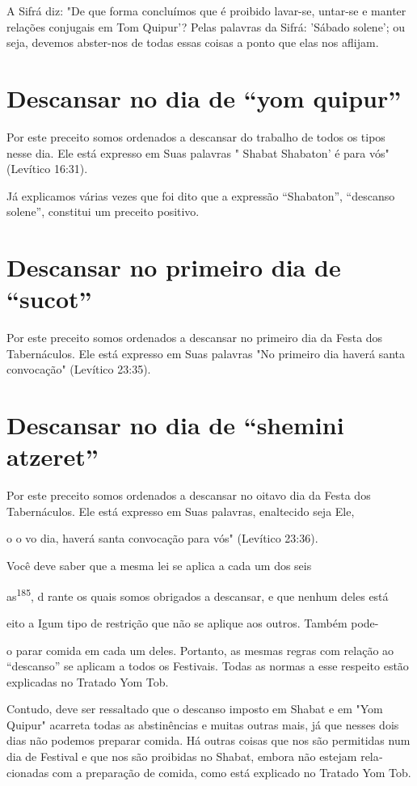 A Sifrá diz: "De que forma concluímos que é proibido lavar-se, untar-se
e manter relações conjugais em Tom Quipur'? Pelas palavras da Sifrá:
'Sába­do solene'; ou seja, devemos abster-nos de todas essas coisas a
ponto que elas nos aflijam.

\section{Descansar no dia de ``yom quipur''}

Por este preceito somos ordenados a descansar do trabalho de to­dos os
tipos nesse dia. Ele está expresso em Suas palavras " Shabat Shabaton' é
para vós" (Levítico 16:31).

Já explicamos várias vezes que foi dito que a expressão ``Shabaton'',
``descanso solene'', constitui um preceito positivo.

\section{Descansar no primeiro dia de ``sucot''}

Por este preceito somos ordenados a descansar no primeiro dia da Festa
dos Tabernáculos. Ele está expresso em Suas palavras "No primeiro dia
haverá santa convocação" (Levítico 23:35).

\section{Descansar no dia de ``shemini atzeret''}

Por este preceito somos ordenados a descansar no oitavo dia da Fes­ta
dos Tabernáculos. Ele está expresso em Suas palavras, enaltecido seja
Ele,

o o vo dia, haverá santa convocação para vós" (Levítico 23:36).


Você deve saber que a mesma lei se aplica a cada um dos seis


as\textsuperscript{185}, d rante os quais somos obrigados a descansar, e
que nenhum deles está

eito a Igum tipo de restrição que não se aplique aos outros. Também
pode-

o parar comida em cada um deles. Portanto, as mesmas regras com rela­ção
ao ``descanso'' se aplicam a todos os Festivais. Todas as normas a esse
res­peito estão explicadas no Tratado Yom Tob.

Contudo, deve ser ressaltado que o descanso imposto em Shabat e em "Yom
Quipur" acarreta todas as abstinências e muitas outras mais, já que
nesses dois dias não podemos preparar comida. Há outras coisas que nos
são permitidas num dia de Festival e que nos são proibidas no Shabat,
embora não estejam rela­cionadas com a preparação de comida, como está
explicado no Tratado Yom Tob.



